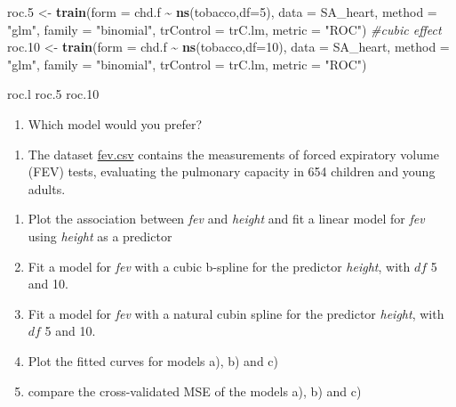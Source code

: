 \documentclass[
]{book}
\newenvironment{Shaded}{\begin{snugshade}}{\end{snugshade}}
\newcommand{\AttributeTok}[1]{\textcolor[rgb]{0.13,0.29,0.53}{#1}}
\newcommand{\CommentTok}[1]{\textcolor[rgb]{0.56,0.35,0.01}{\textit{#1}}}
\newcommand{\DecValTok}[1]{\textcolor[rgb]{0.00,0.00,0.81}{#1}}
\newcommand{\FloatTok}[1]{\textcolor[rgb]{0.00,0.00,0.81}{#1}}
\newcommand{\FunctionTok}[1]{\textcolor[rgb]{0.13,0.29,0.53}{\textbf{#1}}}
\newcommand{\NormalTok}[1]{#1}
\newcommand{\OtherTok}[1]{\textcolor[rgb]{0.56,0.35,0.01}{#1}}
\newcommand{\SpecialCharTok}[1]{\textcolor[rgb]{0.81,0.36,0.00}{\textbf{#1}}}
\newcommand{\StringTok}[1]{\textcolor[rgb]{0.31,0.60,0.02}{#1}}
\providecommand{\tightlist}{%
  \setlength{\itemsep}{0pt}\setlength{\parskip}{0pt}}
\begin{document}
\begin{Shaded}
\begin{Highlighting}[]
\NormalTok{     roc}\FloatTok{.5} \OtherTok{\textless{}{-}} \FunctionTok{train}\NormalTok{(}\AttributeTok{form =}\NormalTok{ chd.f  }\SpecialCharTok{\textasciitilde{}} \FunctionTok{ns}\NormalTok{(tobacco,}\AttributeTok{df=}\DecValTok{5}\NormalTok{),}
                    \AttributeTok{data =}\NormalTok{ SA\_heart,}
                    \AttributeTok{method =} \StringTok{"glm"}\NormalTok{,}
                    \AttributeTok{family =} \StringTok{"binomial"}\NormalTok{,}
                    \AttributeTok{trControl =}\NormalTok{ trC.lm,}
                    \AttributeTok{metric =} \StringTok{"ROC"}\NormalTok{) }
     \CommentTok{\#cubic effect}
\NormalTok{     roc}\FloatTok{.10} \OtherTok{\textless{}{-}} \FunctionTok{train}\NormalTok{(}\AttributeTok{form =}\NormalTok{ chd.f  }\SpecialCharTok{\textasciitilde{}} \FunctionTok{ns}\NormalTok{(tobacco,}\AttributeTok{df=}\DecValTok{10}\NormalTok{),}
                    \AttributeTok{data =}\NormalTok{ SA\_heart,}
                    \AttributeTok{method =} \StringTok{"glm"}\NormalTok{,}
                    \AttributeTok{family =} \StringTok{"binomial"}\NormalTok{,}
                    \AttributeTok{trControl =}\NormalTok{ trC.lm,}
                    \AttributeTok{metric =} \StringTok{"ROC"}\NormalTok{) }
  
\NormalTok{     roc.l}
\NormalTok{     roc}\FloatTok{.5}
\NormalTok{     roc}\FloatTok{.10}
\end{Highlighting}
\end{Shaded}

\begin{enumerate}
\def\labelenumi{\alph{enumi})}
\setcounter{enumi}{5}
\tightlist
\item
  Which model would you prefer?
\end{enumerate}

\begin{enumerate}
\def\labelenumi{\arabic{enumi})}
\setcounter{enumi}{1}
\tightlist
\item
  The dataset \href{https://www.dropbox.com/s/jeqdtq04zl9f0er/FEV.csv?dl=1}{fev.csv} contains the measurements of forced expiratory volume (FEV) tests, evaluating the pulmonary capacity in 654 children and young adults.
\end{enumerate}

\begin{enumerate}
\def\labelenumi{\alph{enumi})}
\item
  Plot the association between \emph{fev} and \emph{height} and fit a linear model for \emph{fev} using \emph{height} as a predictor
\item
  Fit a model for \emph{fev} with a cubic b-spline for the predictor \emph{height}, with \(df\) 5 and 10.
\item
  Fit a model for \emph{fev} with a natural cubin spline for the predictor \emph{height}, with \(df\) 5 and 10.
\item
  Plot the fitted curves for models a), b) and c)
\item
  compare the cross-validated MSE of the models a), b) and c)
\end{enumerate}
\end{document}
